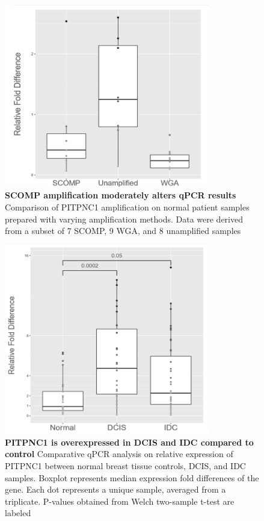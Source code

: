 \documentclass[10pt,letterpaper]{article}
\begin{document}
\vspace*{2\baselineskip}
\begin{figure}[H]
\includegraphics[width = 9cm]{fig1}
\centering
\vspace*{1\baselineskip}
\caption{{\bf SCOMP amplification moderately alters qPCR results}
Comparison of PITPNC1 amplification on normal patient samples prepared with varying amplification methods.  Data were derived from a subset of 7 SCOMP, 9 WGA, and 8 unamplified samples
}
\label{fig1}
\end{figure}
\vspace*{1\baselineskip}
\begin{figure}[H]
\includegraphics[width = 9cm]{fig2}
\centering
\vspace*{1\baselineskip}
\caption{{\bf PITPNC1 is overexpressed in DCIS and IDC compared to control }
Comparative qPCR analysis on relative expression of PITPNC1 between normal breast tissue controls, DCIS, and IDC samples. Boxplot represents median expression fold differences of the gene. Each dot represents a unique sample, averaged from a triplicate. P-values obtained from Welch two-sample t-test are labeled
}
\label{fig2}
\end{figure}
\vspace*{2\baselineskip}
\end{document}
